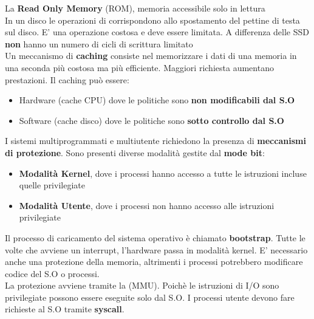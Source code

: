 \documentclass{article}
\begin{document}
La \textbf{Read Only Memory} (ROM), memoria accessibile solo in lettura\\
In un disco le operazioni di  corrispondono allo spostamento del pettine di testa sul disco. E' una operazione costosa e deve essere limitata. A differenza delle SSD \textbf{non} hanno un numero di cicli di scrittura limitato\\
Un meccanismo di \textbf{caching} consiste nel memorizzare  i dati di una memoria in una seconda più costosa ma più efficiente. Maggiori richiesta aumentano prestazioni. Il caching può essere:
\begin{itemize}
  \item Hardware (cache CPU) dove le politiche sono \textbf{non modificabili dal S.O}
  \item Software (cache disco) dove le politiche sono \textbf{sotto controllo dal S.O}
\end{itemize}

I sistemi multiprogrammati e multiutente richiedono la presenza di \textbf{meccanismi di protezione}. Sono presenti diverse modalità gestite dal \textbf{mode bit}:
\begin{itemize}
  \item \textbf{Modalità Kernel}, dove i processi hanno accesso a tutte le istruzioni incluse quelle privilegiate
  \item \textbf{Modalità Utente}, dove i processi non hanno accesso alle istruzioni privilegiate
\end{itemize}
Il processo di caricamento del sistema operativo è chiamato \textbf{bootstrap}. Tutte le volte che avviene un interrupt, l'hardware passa in modalità kernel. E' necessario anche una protezione della memoria, altrimenti i processi potrebbero modificare codice del S.O o processi.\\
La protezione avviene tramite la  (MMU). Poichè le istruzioni di I/O sono privilegiate possono essere eseguite solo dal S.O. I processi utente devono fare richieste al S.O tramite \textbf{syscall}.
\end{document}
